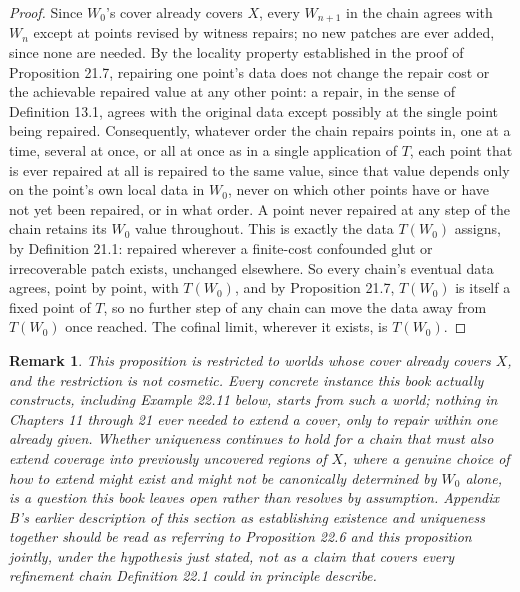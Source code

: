 \documentclass[11pt]{book}
\newtheorem{remark}[theorem]{Remark}
\begin{document}
\begin{proof}
Since $W_0$'s cover already covers $X$, every $W_{n+1}$ in the chain agrees with $W_n$ except at points revised by witness repairs; no new patches are ever added, since none are needed. By the locality property established in the proof of Proposition 21.7, repairing one point's data does not change the repair cost or the achievable repaired value at any other point: a repair, in the sense of Definition 13.1, agrees with the original data except possibly at the single point being repaired. Consequently, whatever order the chain repairs points in, one at a time, several at once, or all at once as in a single application of $T$, each point that is ever repaired at all is repaired to the same value, since that value depends only on the point's own local data in $W_0$, never on which other points have or have not yet been repaired, or in what order. A point never repaired at any step of the chain retains its $W_0$ value throughout. This is exactly the data $T(W_0)$ assigns, by Definition 21.1: repaired wherever a finite-cost confounded glut or irrecoverable patch exists, unchanged elsewhere. So every chain's eventual data agrees, point by point, with $T(W_0)$, and by Proposition 21.7, $T(W_0)$ is itself a fixed point of $T$, so no further step of any chain can move the data away from $T(W_0)$ once reached. The cofinal limit, wherever it exists, is $T(W_0)$.
\end{proof}

\begin{remark}
This proposition is restricted to worlds whose cover already covers $X$, and the restriction is not cosmetic. Every concrete instance this book actually constructs, including Example 22.11 below, starts from such a world; nothing in Chapters 11 through 21 ever needed to extend a cover, only to repair within one already given. Whether uniqueness continues to hold for a chain that must also extend coverage into previously uncovered regions of $X$, where a genuine choice of how to extend might exist and might not be canonically determined by $W_0$ alone, is a question this book leaves open rather than resolves by assumption. Appendix B's earlier description of this section as establishing existence and uniqueness together should be read as referring to Proposition 22.6 and this proposition jointly, under the hypothesis just stated, not as a claim that covers every refinement chain Definition 22.1 could in principle describe.
\end{remark}
\end{document}
